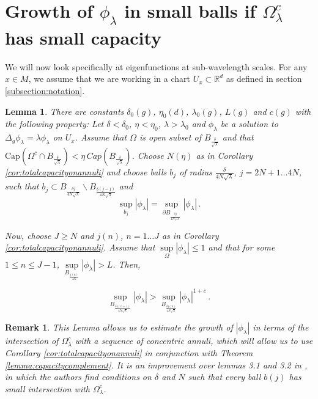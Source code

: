 \documentclass{amsart}
\newtheorem{lemma}[theorem]{Lemma}
\newtheorem{remark}[theorem]{Remark}
\begin{document}
\section{Growth of $\phi_\lambda$ in small balls if $\Omega_\lambda^c$ has small capacity}

We will now look specifically at eigenfunctions at sub-wavelength scales. For any $x \in M$, we assume that we are working in a chart $U_x \subset \mathbb R^d$ as defined in section \ref{subsection:notation}.

\begin{lemma}\label{lemma:inductive}
There are constants $\delta_0(g)$,  $\eta_0(d)$, $\lambda_0(g)$, $L(g)$ and $c(g)$  with the following property:
Let $\delta < \delta_0$, $\eta < \eta_0$, $\lambda > \lambda_0$ and $\phi_{\lambda}$ be a solution to $\Delta_{g} \phi_\lambda= \lambda \phi_\lambda$ on $U_{x}$.
Assume that $\Omega$ is open subset of  ${B_{\frac{\delta}{\sqrt{\lambda}}}}$ and that $\text{Cap}(\Omega^c \cap B_{\frac{\delta}{\sqrt{\lambda}}}) < \eta \,  Cap(B_{\frac{\delta}{\sqrt{\lambda}}})$.  Choose $N(\eta)$ as in Corollary \ref{cor:totalcapacityonannuli} and choose balls $b_j$ of radius $\frac{\delta}{4N\sqrt{\lambda}}$, $j=2N+1 \ldots 4N$, such that
$b_j \subset B_{\frac{\delta j}{4N\sqrt{\lambda}}} \backslash B_{\frac{\delta (j-1)}{4N\sqrt{\lambda}}}$ and 
\begin{equation}\label{eq:ballsmaxchoice}
    \sup\limits_{b_{j}} |\phi_{\lambda}| = \sup\limits_{\partial B_{\frac{\delta j}{4N\sqrt{\lambda}}}} |\phi_{\lambda}|\,.
\end{equation}


Now, choose $J \geq N$ and $j(n)$, $n=1 \ldots J$ as in Corollary \ref{cor:totalcapacityonannuli}. 
    Assume that $\sup\limits_\Omega |\phi_{\lambda}|\leq 1$ and that for some $1 \leq n \leq J-1$, $\sup\limits_{B_{\frac{j(n)}{4N}}} |\phi_{\lambda}|> L$. Then,  
    
    \begin{equation}
        \sup\limits_{B_{\frac{\delta j(n+1)}{4N\sqrt{\lambda}}}} |\phi_{\lambda}|>\sup\limits_{B_{\frac{\delta j(n)}{4N\sqrt{\lambda}}}} |\phi_{\lambda}|^{1+c}\,.
    \end{equation}
\end{lemma}

\begin{remark}
    This Lemma allows us to estimate the growth of $|\phi_\lambda|$ in terms of the intersection of $\Omega_\lambda^c$ with a sequence of concentric annuli, which will allow us to use Corollary \ref{cor:totalcapacityonannuli} in conjunction with Theorem \ref{lemma:capacitycomplement}. It is an improvement over lemmas 3.1 and 3.2 in \cite{cha-man}, in which the authors find conditions on $\delta$ and $N$ such that every ball $b(j)$ has small intersection with $\Omega_\lambda^c$. 
\end{remark}
\end{document}
